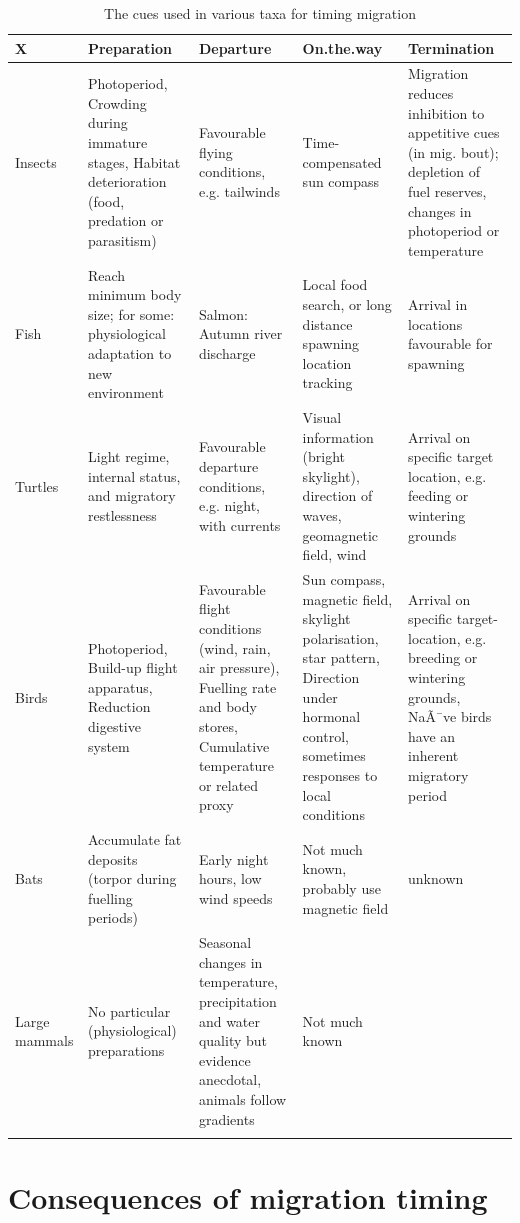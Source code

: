 \documentclass[
]{book}
\begin{document}
\begin{table}

\caption{\label{tab:nice-tab}The cues used in various taxa for timing migration}
\centering
\begin{tabular}[t]{lllll}
\toprule
X & Preparation & Departure & On.the.way & Termination\\
\midrule
Insects & Photoperiod, Crowding during immature stages, Habitat deterioration (food, predation or parasitism) & Favourable flying conditions, e.g. tailwinds & Time-compensated sun compass & Migration reduces inhibition to appetitive cues (in mig. bout); depletion of fuel reserves, changes in photoperiod or temperature\\
Fish & Reach minimum body size; for some: physiological adaptation to new environment & Salmon: Autumn river discharge & Local food search, or long distance spawning location tracking & Arrival in locations favourable for spawning\\
Turtles & Light regime, internal status, and migratory restlessness & Favourable departure conditions, e.g. night, with currents & Visual information (bright skylight), direction of waves, geomagnetic field, wind & Arrival on specific target location, e.g. feeding or wintering grounds\\
Birds & Photoperiod, Build-up flight apparatus, Reduction digestive system & Favourable flight conditions (wind, rain, air pressure), Fuelling rate and body stores, Cumulative temperature or related proxy & Sun compass, magnetic field, skylight polarisation, star pattern, Direction under hormonal control, sometimes responses to local conditions & Arrival on specific target-location, e.g. breeding or wintering grounds, NaÃ¯ve birds have an inherent migratory period\\
Bats & Accumulate fat deposits (torpor during fuelling periods) & Early night hours, low wind speeds & Not much known, probably use magnetic field & unknown\\
\addlinespace
Large mammals & No particular (physiological) preparations & Seasonal changes in temperature, precipitation and water quality but evidence anecdotal, animals follow gradients & Not much known & \\
 &  &  &  & \\
\bottomrule
\end{tabular}
\end{table}

\hypertarget{consequences-of-migration-timing}{%
\section{Consequences of migration timing}\label{consequences-of-migration-timing}}
\end{document}
